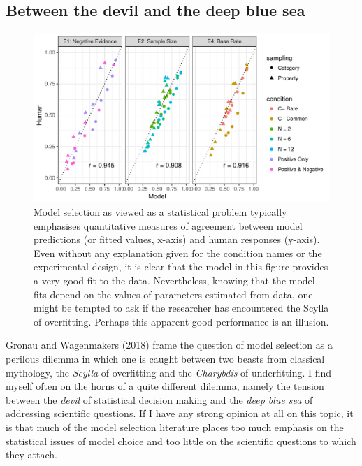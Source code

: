 \documentclass[doc]{apa6}
\theoremstyle{definition}
\theoremstyle{definition}
\theoremstyle{definition}
\theoremstyle{remark}
\begin{document}
\subsection{Between the devil and the deep blue
sea}\label{between-the-devil-and-the-deep-blue-sea}

\begin{figure}
\includegraphics{./fits_scatter.pdf}
\caption{Model selection as viewed as a statistical problem typically emphasises quantitative measures of agreement between model predictions (or fitted values, x-axis) and human responses (y-axis). Even without any explanation given for the condition names or the experimental design, it is clear that the model in this figure provides a very good fit to the data. Nevertheless, knowing that the model fits depend on the values of parameters estimated from data, one might be tempted to ask if the researcher has encountered the Scylla of overfitting. Perhaps this apparent good performance is an illusion.}
\end{figure}

Gronau and Wagenmakers (2018) frame the question of model selection as a
perilous dilemma in which one is caught between two beasts from
classical mythology, the \emph{Scylla} of overfitting and the
\emph{Charybdis} of underfitting. I find myself often on the horns of a
quite different dilemma, namely the tension between the \emph{devil} of
statistical decision making and the \emph{deep blue sea} of addressing
scientific questions. If I have any strong opinion at all on this topic,
it is that much of the model selection literature places too much
emphasis on the statistical issues of model choice and too little on the
scientific questions to which they attach.
\end{document}
